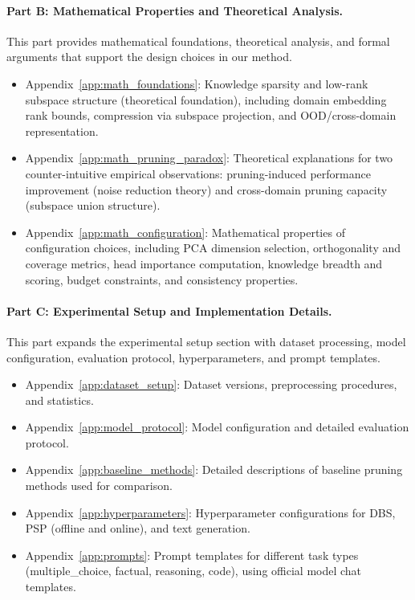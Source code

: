 \paragraph{Part B: Mathematical Properties and Theoretical Analysis.}
This part provides mathematical foundations, theoretical analysis, and formal arguments that support the design choices in our method.
\begin{itemize}
    \item Appendix~\ref{app:math_foundations}: Knowledge sparsity and low-rank subspace structure (theoretical foundation), including domain embedding rank bounds, compression via subspace projection, and OOD/cross-domain representation.
    \item Appendix~\ref{app:math_pruning_paradox}: Theoretical explanations for two counter-intuitive empirical observations: pruning-induced performance improvement (noise reduction theory) and cross-domain pruning capacity (subspace union structure).
    \item Appendix~\ref{app:math_configuration}: Mathematical properties of configuration choices, including PCA dimension selection, orthogonality and coverage metrics, head importance computation, knowledge breadth and scoring, budget constraints, and consistency properties.
\end{itemize}

\paragraph{Part C: Experimental Setup and Implementation Details.}
This part expands the experimental setup section with dataset processing, model configuration, evaluation protocol, hyperparameters, and prompt templates.
\begin{itemize}
    \item Appendix~\ref{app:dataset_setup}: Dataset versions, preprocessing procedures, and statistics.
    \item Appendix~\ref{app:model_protocol}: Model configuration and detailed evaluation protocol.
    \item Appendix~\ref{app:baseline_methods}: Detailed descriptions of baseline pruning methods used for comparison.
    \item Appendix~\ref{app:hyperparameters}: Hyperparameter configurations for DBS, PSP (offline and online), and text generation.
    \item Appendix~\ref{app:prompts}: Prompt templates for different task types (multiple\_choice, factual, reasoning, code), using official model chat templates.
\end{itemize}

